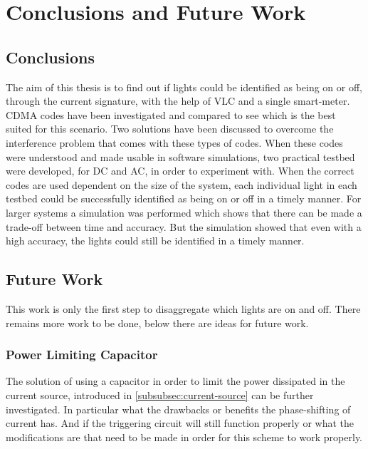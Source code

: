 
\chapter{Conclusions and Future Work}
\label{chp:conclusionsandfuturework}

	\section{Conclusions}


	The aim of this thesis is to find out if lights could be identified as being on or off, through the current signature, with the help of VLC and a single smart-meter.
	CDMA codes have been investigated and compared to see which is the best suited for this scenario.
	Two solutions have been discussed to overcome the interference problem that comes with these types of codes.
	When these codes were understood and made usable in software simulations, two practical testbed were developed, for DC and AC, in order to experiment with.
	When the correct codes are used dependent on the size of the system, each individual light in each testbed could be successfully identified as being on or off in a timely manner.
	For larger systems a simulation was performed which shows that there can be made a trade-off between time and accuracy. 
	But the simulation showed that even with a high accuracy, the lights could still be identified in a timely manner.






\section{Future Work}


This work is only the first step to disaggregate which lights are on and off.
There remains more work to be done, below there are ideas for future work.

	\subsection{Power Limiting Capacitor}

	The solution of using a capacitor in order to limit the power dissipated in the current source, introduced in \autoref{subsubsec:current-source} can be further investigated.
	In particular what the drawbacks or benefits the phase-shifting of current has.
	And if the triggering circuit will still function properly or what the modifications are that need to be made in order for this scheme to work properly.


